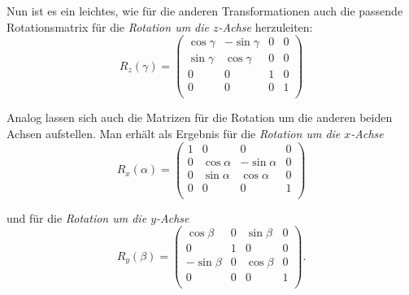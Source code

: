 Nun ist es ein leichtes, wie für die anderen Transformationen auch die passende Rotationsmatrix für die \emph{Rotation um die $z$-Achse} herzuleiten:
\begin{equation}
 R_z{(\gamma)}
 = 
 \begin{pmatrix}
  \cos \gamma & -\sin \gamma & 0 & 0 \\
  \sin \gamma &  \cos \gamma & 0 & 0 \\
  0 & 0 & 1 & 0 \\
  0 & 0 & 0 & 1 \\
 \end{pmatrix}
\end{equation}

Analog lassen sich auch die Matrizen für die Rotation um die anderen beiden Achsen aufstellen. Man erhält als Ergebnis für die \emph{Rotation um die $x$-Achse}
\begin{equation}
 R_x{(\alpha)}
 = 
 \begin{pmatrix}
  1 & 0 & 0 & 0 \\
  0 & \cos \alpha & -\sin \alpha & 0 \\
  0 & \sin \alpha &  \cos \alpha & 0 \\
  0 & 0 & 0 & 1 \\
 \end{pmatrix}
\end{equation}

und für die \emph{Rotation um die $y$-Achse}
\begin{equation}
 R_y{(\beta)}
 = 
 \begin{pmatrix}
  \cos \beta & 0 & \sin \beta & 0 \\
  0 & 1 & 0 & 0 \\
  -\sin \beta & 0 & \cos \beta & 0 \\
  0 & 0 & 0 & 1 \\
 \end{pmatrix}.
\end{equation}

